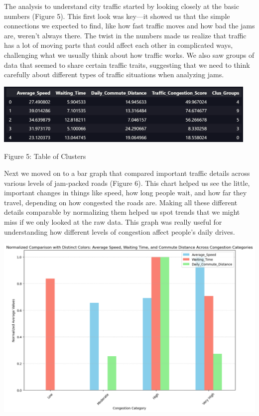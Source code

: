 \documentclass{article}
\begin{document}
\begin{multicols}{2}
The analysis to understand city traffic started by looking closely at the basic numbers (Figure 5). This first look was key—it showed us that the simple connections we expected to find, like how fast traffic moves and how bad the jams are, weren't always there. The twist in the numbers made us realize that traffic has a lot of moving parts that could affect each other in complicated ways, challenging what we usually think about how traffic works. We also saw groups of data that seemed to share certain traffic traits, suggesting that we need to think carefully about different types of traffic situations when analyzing jams.

\includegraphics[scale=.52]{img/tableclus.png}

{\small
  Figure 5: Table of Clusters
  \par
  \vspace{6pt}
}

Next we moved on to a bar graph that compared important traffic details across various levels of jam-packed roads (Figure 6). This chart helped us see the little, important changes in things like speed, how long people wait, and how far they travel, depending on how congested the roads are. Making all these different details comparable by normalizing them helped us spot trends that we might miss if we only looked at the raw data. This graph was really useful for understanding how different levels of congestion affect people's daily drives.

\includegraphics[scale=.24]{img/cluschart.png}


\end{multicols}
\end{document}
